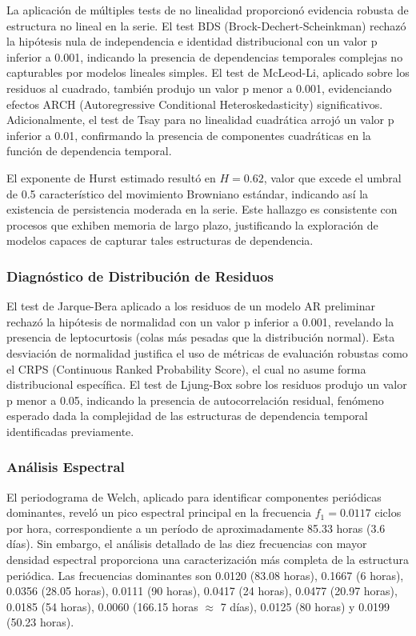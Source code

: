 La aplicación de múltiples tests de no linealidad proporcionó evidencia robusta de estructura no lineal en la serie. El test BDS (Brock-Dechert-Scheinkman) rechazó la hipótesis nula de independencia e identidad distribucional con un valor p inferior a 0.001, indicando la presencia de dependencias temporales complejas no capturables por modelos lineales simples. El test de McLeod-Li, aplicado sobre los residuos al cuadrado, también produjo un valor p menor a 0.001, evidenciando efectos ARCH (Autoregressive Conditional Heteroskedasticity) significativos. Adicionalmente, el test de Tsay para no linealidad cuadrática arrojó un valor p inferior a 0.01, confirmando la presencia de componentes cuadráticas en la función de dependencia temporal.

El exponente de Hurst estimado resultó en $H = 0.62$, valor que excede el umbral de 0.5 característico del movimiento Browniano estándar, indicando así la existencia de persistencia moderada en la serie. Este hallazgo es consistente con procesos que exhiben memoria de largo plazo, justificando la exploración de modelos capaces de capturar tales estructuras de dependencia.

\subsubsection{Diagnóstico de Distribución de Residuos}

El test de Jarque-Bera aplicado a los residuos de un modelo AR preliminar rechazó la hipótesis de normalidad con un valor p inferior a 0.001, revelando la presencia de leptocurtosis (colas más pesadas que la distribución normal). Esta desviación de normalidad justifica el uso de métricas de evaluación robustas como el CRPS (Continuous Ranked Probability Score), el cual no asume forma distribucional específica. El test de Ljung-Box sobre los residuos produjo un valor p menor a 0.05, indicando la presencia de autocorrelación residual, fenómeno esperado dada la complejidad de las estructuras de dependencia temporal identificadas previamente.

\subsubsection{Análisis Espectral}

El periodograma de Welch, aplicado para identificar componentes periódicas dominantes, reveló un pico espectral principal en la frecuencia $f_1 = 0.0117$ ciclos por hora, correspondiente a un período de aproximadamente 85.33 horas (3.6 días). Sin embargo, el análisis detallado de las diez frecuencias con mayor densidad espectral proporciona una caracterización más completa de la estructura periódica. Las frecuencias dominantes son 0.0120 (83.08 horas), 0.1667 (6 horas), 0.0356 (28.05 horas), 0.0111 (90 horas), 0.0417 (24 horas), 0.0477 (20.97 horas), 0.0185 (54 horas), 0.0060 (166.15 horas $\approx$ 7 días), 0.0125 (80 horas) y 0.0199 (50.23 horas).

